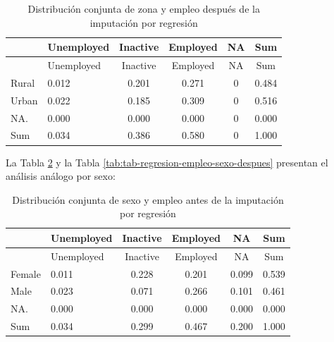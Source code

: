 \documentclass[
  spanish,
  12pt,
]{book}
\newenvironment{Shaded}{\begin{snugshade}}{\end{snugshade}}
\newcommand{\AttributeTok}[1]{\textcolor[rgb]{0.13,0.29,0.53}{#1}}
\newcommand{\FunctionTok}[1]{\textcolor[rgb]{0.13,0.29,0.53}{\textbf{#1}}}
\newcommand{\NormalTok}[1]{#1}
\newcommand{\SpecialCharTok}[1]{\textcolor[rgb]{0.81,0.36,0.00}{\textbf{#1}}}
\newcommand{\StringTok}[1]{\textcolor[rgb]{0.31,0.60,0.02}{#1}}
\begin{document}
\begin{longtable}[]{@{}llcccc@{}}
\caption{\label{tab:tab-regresion-empleo-zona-despues}Distribución conjunta de zona y empleo después de la imputación por regresión}\tabularnewline
\toprule\noalign{}
& Unemployed & Inactive & Employed & NA & Sum \\
\midrule\noalign{}
\endfirsthead
\toprule\noalign{}
& Unemployed & Inactive & Employed & NA & Sum \\
\midrule\noalign{}
\endhead
\bottomrule\noalign{}
\endlastfoot
Rural & 0.012 & 0.201 & 0.271 & 0 & 0.484 \\
Urban & 0.022 & 0.185 & 0.309 & 0 & 0.516 \\
NA. & 0.000 & 0.000 & 0.000 & 0 & 0.000 \\
Sum & 0.034 & 0.386 & 0.580 & 0 & 1.000 \\
\end{longtable}

La Tabla \ref{tab:tab-regresion-empleo-sexo-antes} y la Tabla \ref{tab:tab-regresion-empleo-sexo-despues} presentan el análisis análogo por sexo:

\begin{Shaded}
\end{Shaded}

\begin{longtable}[]{@{}llcccc@{}}
\caption{\label{tab:tab-regresion-empleo-sexo-antes}Distribución conjunta de sexo y empleo antes de la imputación por regresión}\tabularnewline
\toprule\noalign{}
& Unemployed & Inactive & Employed & NA & Sum \\
\midrule\noalign{}
\endfirsthead
\toprule\noalign{}
& Unemployed & Inactive & Employed & NA & Sum \\
\midrule\noalign{}
\endhead
\bottomrule\noalign{}
\endlastfoot
Female & 0.011 & 0.228 & 0.201 & 0.099 & 0.539 \\
Male & 0.023 & 0.071 & 0.266 & 0.101 & 0.461 \\
NA. & 0.000 & 0.000 & 0.000 & 0.000 & 0.000 \\
Sum & 0.034 & 0.299 & 0.467 & 0.200 & 1.000 \\
\end{longtable}
\end{document}
